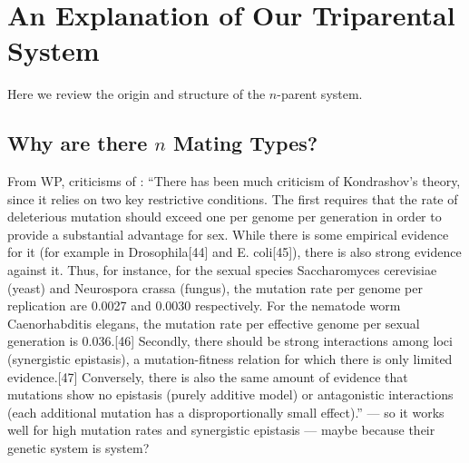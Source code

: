 

\section{An Explanation of Our Triparental System}

Here we review the origin and structure of the $n$-parent system.


\subsection{Why are there $n$ Mating Types?}





From WP, criticisms of \cite{kondrashov_deleterious_1988}: ``There has been much criticism of Kondrashov's theory, since it relies on two key restrictive conditions. The first requires that the rate of deleterious mutation should exceed one per genome per generation in order to provide a substantial advantage for sex. While there is some empirical evidence for it (for example in Drosophila[44] and E. coli[45]), there is also strong evidence against it. Thus, for instance, for the sexual species Saccharomyces cerevisiae (yeast) and Neurospora crassa (fungus), the mutation rate per genome per replication are 0.0027 and 0.0030 respectively. For the nematode worm Caenorhabditis elegans, the mutation rate per effective genome per sexual generation is 0.036.[46] Secondly, there should be strong interactions among loci (synergistic epistasis), a mutation-fitness relation for which there is only limited evidence.[47] Conversely, there is also the same amount of evidence that mutations show no epistasis (purely additive model) or antagonistic interactions (each additional mutation has a disproportionally small effect).'' --- so it works well for high mutation rates and synergistic epistasis --- maybe because their genetic system is system?


